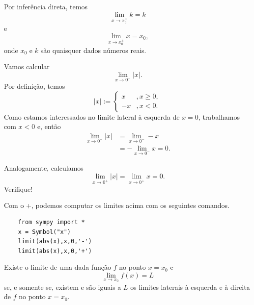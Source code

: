 \begin{obs}
  Por inferência direta, temos
  \begin{equation}
    \lim_{x\to x_0^{\pm}} k = k
  \end{equation}
  e
  \begin{equation}
    \lim_{x\to x_0^{\pm}} x = x_0,
  \end{equation}
  onde $x_0$ e $k$ são quaisquer dados números reais.
\end{obs}

\begin{exer}\label{ex:lim_absx}
  Vamos calcular
  \begin{equation}
    \lim_{x\to 0^-} |x|.
  \end{equation}
  Por definição, temos
  \begin{equation}
    |x| := \left\{
      \begin{array}{ll}
        x &, x\geq 0,\\
        -x &, x< 0.
      \end{array}
    \right.
  \end{equation}
  Como estamos interessados no limite lateral à esquerda de $x=0$, trabalhamos com $x<0$ e, então
  \begin{align}
    \lim_{x\to 0^-} |x| &= \lim_{x\to 0^-} -x\\
                        &= -\lim_{x\to 0^-} x = 0.
  \end{align}
  
  Analogamente, calculamos
  \begin{equation}
    \lim_{x\to 0^+} |x| = \lim_{x\to 0^+} x = 0.
  \end{equation}
  Verifique!

  \ifispython
  Com o {\python}+{\sympy}, podemos computar os limites acima com os seguintes comandos.
  \begin{lstlisting}
    from sympy import *
    x = Symbol("x")
    limit(abs(x),x,0,'-')
    limit(abs(x),x,0,'+')
  \end{lstlisting}
  \fi
\end{exer}

\begin{teo}\label{teo:lim_existe}
  Existe o limite de uma dada função $f$ no ponto $x=x_0$ e
  \begin{equation}
    \lim_{x\to x_0} f(x) = L
  \end{equation}
  se, e somente se, existem e são iguais a $L$ os limites laterais à esquerda e à direita de $f$ no ponto $x=x_0$.
\end{teo}

